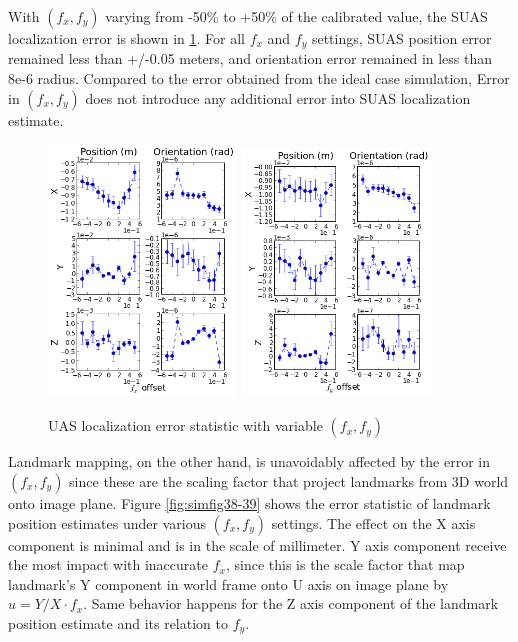 With $(f_x, f_y)$ varying from -50\% to +50\% of the calibrated value, the SUAS localization error is shown in \ref{fig:simfig43-44}. For all $f_x$ and $f_y$ settings, SUAS position error remained less than +/-0.05 meters, and orientation error remained in less than 8e-6 radius. Compared to the error obtained from the ideal case simulation, Error in $(f_x, f_y)$ does not introduce any additional error into SUAS localization estimate. 
\begin{figure}[h]
  \centering
  \includegraphics[width=5cm,keepaspectratio=true]{./Figures/SimulationFigures/Figure43.png}
  \includegraphics[width=5cm,keepaspectratio=true]{./Figures/SimulationFigures/Figure44.png}
  \caption{UAS localization error statistic with variable $(f_x, f_y)$}
  \label{fig:simfig43-44}
\end{figure}

Landmark mapping, on the other hand, is unavoidably affected by the
error in $(f_x, f_y)$ since these are the scaling factor that project
landmarks from 3D world onto image plane. Figure \ref{fig:simfig38-39}
shows the error statistic of landmark position estimates under various
$(f_x, f_y)$ settings. The effect on the X axis component is minimal
and is in the scale of millimeter. Y axis component receive the most
impact with inaccurate $f_x$, since this is the scale factor that map
landmark's Y component in world frame onto U axis on image plane by $u
= Y/X \cdot f_x$. Same behavior happens for the Z axis component of
the landmark position estimate and its relation to $f_y$.

